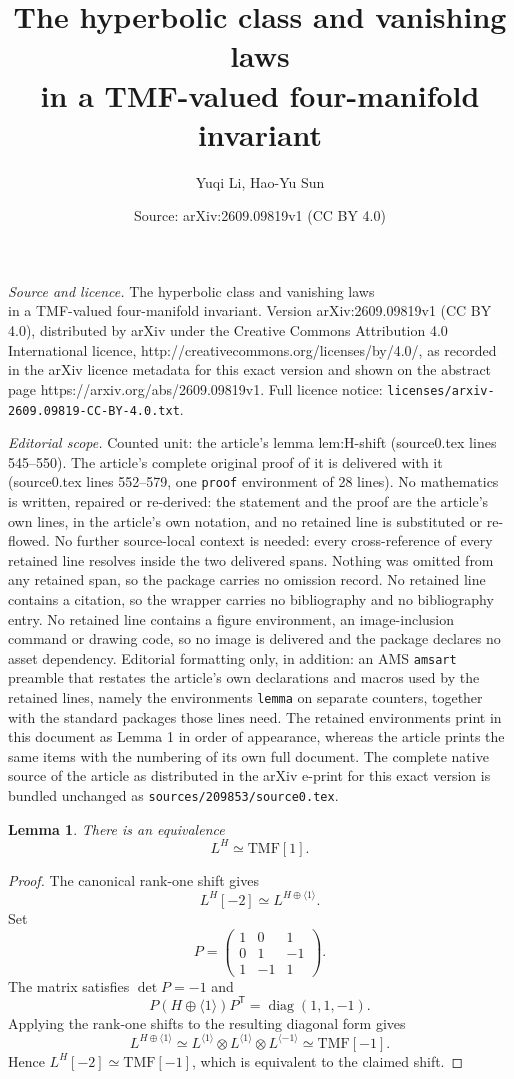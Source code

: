 \documentclass[10pt,a4paper]{amsart}
\title{The hyperbolic class and vanishing laws\\in a TMF-valued four-manifold invariant}
\author{Yuqi Li, Hao-Yu Sun}
\date{Source: arXiv:2609.09819v1 (CC BY 4.0)}
\newtheorem{lemma}{Lemma}
\newcommand{\TMF}{\mathrm{TMF}}
\begin{document}
\maketitle

\noindent\emph{Source and licence.} The hyperbolic class and vanishing laws\\in a TMF-valued four-manifold invariant. Version arXiv:2609.09819v1 (CC BY 4.0), distributed by arXiv under the Creative Commons Attribution 4.0 International licence, http://creativecommons.org/licenses/by/4.0/, as recorded in the arXiv licence metadata for this exact version and shown on the abstract page https://arxiv.org/abs/2609.09819v1. Full licence notice: \texttt{licenses/arxiv-2609.09819-CC-BY-4.0.txt}.\par\smallskip

\noindent\textit{Editorial scope.} Counted unit: the article's lemma lem:H-shift (source0.tex lines 545--550). The article's complete original proof of it is delivered with it (source0.tex lines 552--579, one \texttt{proof} environment of 28 lines). No mathematics is written, repaired or re-derived: the statement and the proof are the article's own lines, in the article's own notation, and no retained line is substituted or re-flowed.  No further source-local context is needed: every cross-reference of every retained line resolves inside the two delivered spans.  Nothing was omitted from any retained span, so the package carries no omission record.  No retained line contains a citation, so the wrapper carries no bibliography and no bibliography entry.  No retained line contains a figure environment, an image-inclusion command or drawing code, so no image is delivered and the package declares no asset dependency.  Editorial formatting only, in addition: an AMS \texttt{amsart} preamble that restates the article's own declarations and macros used by the retained lines, namely the environments \texttt{lemma} on separate counters, together with the standard packages those lines need.  The retained environments print in this document as Lemma 1 in order of appearance, whereas the article prints the same items with the numbering of its own full document.  The complete native source of the article as distributed in the arXiv e-print for this exact version is bundled unchanged as \texttt{sources/209853/source0.tex}.
\begin{lemma}\label{lem:H-shift}
There is an equivalence
\[
 L^H\simeq\TMF[1].
\]
\end{lemma}

\begin{proof}
The canonical rank-one shift gives
\[
 L^H[-2]\simeq L^{H\oplus\langle1\rangle}.
\]
Set
\[
 P=\begin{pmatrix}
 1&0&1\\
 0&1&-1\\
 1&-1&1
 \end{pmatrix}.
\]
The matrix satisfies $\det P=-1$ and
\[
 P(H\oplus\langle1\rangle)P^{\mathsf T}
 =\operatorname{diag}(1,1,-1).
\]
Applying the rank-one shifts to the resulting diagonal form gives
\[
 L^{H\oplus\langle1\rangle}
 \simeq
 L^{\langle1\rangle}\otimes L^{\langle1\rangle}\otimes L^{\langle-1\rangle}
 \simeq\TMF[-1].
\]
Hence $L^H[-2]\simeq\TMF[-1]$, which is equivalent to the
claimed shift.
\end{proof}
\end{document}
